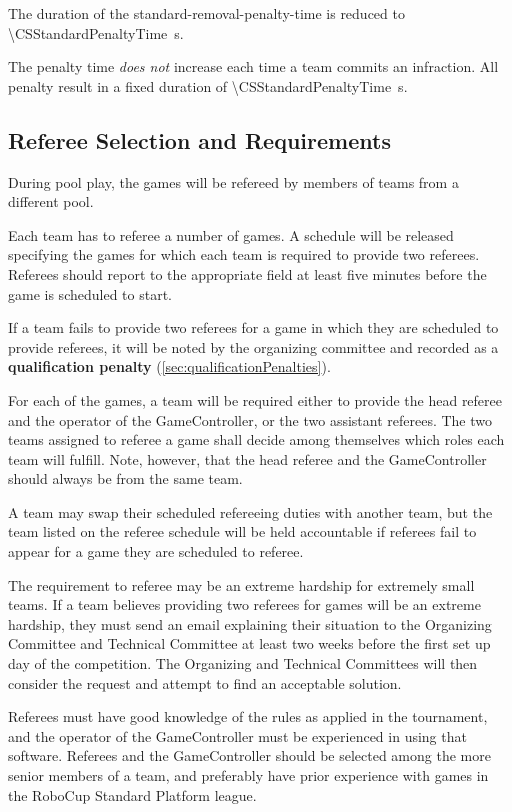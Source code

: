 The duration of the standard-removal-penalty-time is reduced to \qty{\CSStandardPenaltyTime}{\second}.

The penalty time \emph{does not} increase each time a team commits an infraction. All penalty result in a fixed duration of \qty{\CSStandardPenaltyTime}{\second}.

\subsection{Referee Selection and Requirements}
\label{sec:refSelection}
During pool play, the games will be refereed by members of teams from a different pool.

Each team has to referee a number of games. A schedule will be released specifying the games for which each team is required to provide two referees. Referees should report to the appropriate field at least five minutes before the game is scheduled to start.

If a team fails to provide two referees for a game in which they are scheduled to provide referees, it will be noted by the organizing committee and recorded as a \textbf{qualification penalty} (\cref{sec:qualificationPenalties}).

For each of the games, a team will be required either to provide the head referee and the operator of the GameController, or the two assistant referees.  The two teams assigned to referee a game shall decide among themselves which roles each team will fulfill. Note, however, that the head referee and the GameController should always be from the same team.

A team may swap their scheduled refereeing duties with another team, but the team listed on the referee schedule will be held accountable if referees fail to appear for a game they are scheduled to referee.

The requirement to referee may be an extreme hardship for extremely small teams.  If a team believes providing two referees for games will be an extreme hardship, they must send an email explaining their situation to the Organizing Committee and Technical Committee at least two weeks before the first set up day of the competition.  The Organizing and Technical Committees will then consider the request and attempt to find an acceptable solution.

Referees must have good knowledge of the rules as applied in the tournament, and the operator of the GameController must be experienced in using that software. Referees and the GameController should be selected among the more senior members of a team, and preferably have prior experience with games in the RoboCup Standard Platform league.

